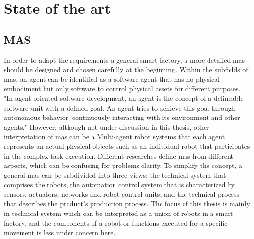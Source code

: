 \chapter{State of the art}%
\section{MAS}


In order to adapt the requirements a general smart factory, a more detailed \gls{mas} should be designed and chosen carefully at the beginning. Within the subfields of \gls{mas}, an agent can be identified as a software agent that has no physical embodiment but only software to control physical assets for different purposes. "In agent-oriented software development, an agent is the concept of a delineable software unit with a defined goal. An agent tries to achieve this goal through autonomous behavior, continuously interacting with its environment and other agents." \cite{wagner_agentenunterstutztes_2008} However, although not under discussion in this thesis, other interpretation of \gls{mas} can be a Multi-agent robot systems that each agent represents an actual physical objects such as an individual robot that participates in the complex task execution. \cite{ota_multi-agent_2006}   
Different researches define \gls{mas} from different aspects, which can be confusing for problems clarity. To simplify the concept, a general \gls{mas} can be subdivided into three views: the technical system that comprises the robots, the automation control system that is characterized by sensors, actuators, networks and robot control units, and the technical process that describes the product's production process.\cite{lauber_prozessautomatisierung_1999} \cite{wannagat_agent_nodate}The focus of this thesis is mainly in technical system which can be interpreted as a union of robots in a smart factory, and the components of a robot or functions executed for a specific movement is less under concern here. 


